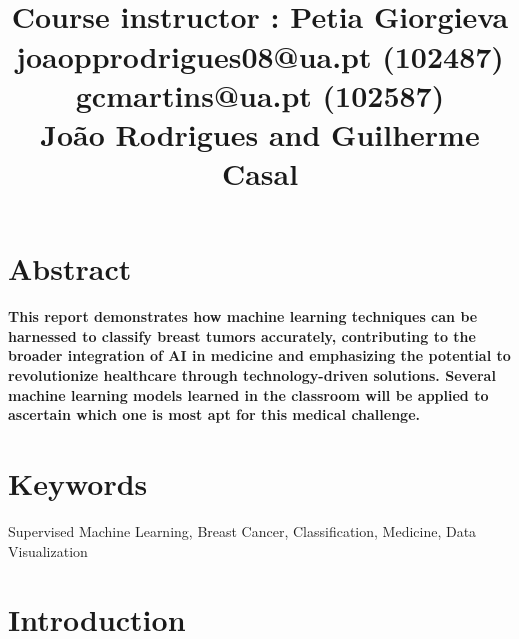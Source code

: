 \documentclass[12pt,a4paper,twocolumn]{article}
\begin{document}
\title{\begin{center}
    \\
    
    \large{Course instructor : Petia Giorgieva} \\
    \small{joaopprodrigues08@ua.pt (102487)\\ gcmartins@ua.pt (102587)}\\
    \large{João Rodrigues and Guilherme Casal}\\
\end{center}} 




\thispagestyle{fancy}
\maketitle


\section{Abstract}
\textbf{This report demonstrates how machine learning techniques can be harnessed to classify breast tumors accurately, contributing to the broader integration of AI in medicine and emphasizing the potential to revolutionize healthcare through technology-driven solutions. Several machine learning models learned in the classroom will be applied to ascertain which one is most apt for this medical challenge.} 



\section{Keywords}

Supervised Machine Learning, 
Breast Cancer,
Classification,
Medicine,
Data Visualization





\section{Introduction}
\end{document}
